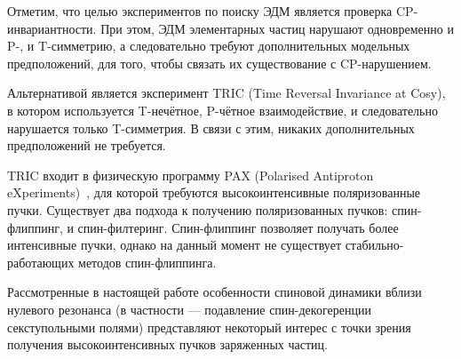 
Отметим, что целью экспериментов по поиску ЭДМ является проверка CP-инвариантности. При этом, ЭДМ элементарных частиц нарушают одновременно и P-, и T-симметрию, а следовательно требуют дополнительных модельных предположений, для того, чтобы связать их существование с CP-нарушением.~\cite[стр.~1926]{TRIC}

Альтернативой является эксперимент TRIC (Time Reversal Invariance at Cosy),~\cite{TRIC} в котором используется T-нечётное, P-чётное взаимодействие, и следовательно нарушается только T-симметрия. В связи с этим, никаких дополнительных предположений не требуется.

TRIC входит в физическую программу PAX (Polarised Antiproton eXperiments)~\cite{PAX}, для которой требуются высокоинтенсивные поляризованные пучки. Существует два подхода к получению поляризованных пучков: спин-флиппинг, и спин-филтеринг. Спин-флиппинг позволяет получать более интенсивные пучки, однако на данный момент не существует стабильно-работающих методов спин-флиппинга.

Рассмотренные в настоящей работе особенности спиновой динамики вблизи нулевого резонанса (в частности --- подавление спин-декогеренции секступольными полями) представляют некоторый интерес с точки зрения получения высокоинтенсивных пучков заряженных частиц.